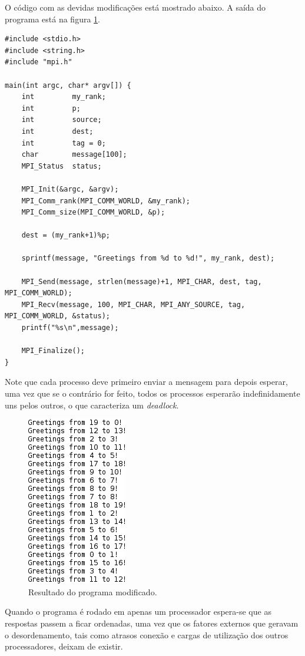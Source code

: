 \documentclass[11pt,a4paper,onecolumn]{article}
\begin{document}
O código com as devidas modificações está mostrado abaixo. A saída do programa está na figura \ref{fig:exp}.
\begin{lstlisting}[style=cc,firstnumber=18]
#include <stdio.h>
#include <string.h>
#include "mpi.h"

main(int argc, char* argv[]) {
    int         my_rank;
    int         p;
    int         source;
    int         dest;
    int         tag = 0;
    char        message[100];
    MPI_Status  status;

    MPI_Init(&argc, &argv);
    MPI_Comm_rank(MPI_COMM_WORLD, &my_rank);
    MPI_Comm_size(MPI_COMM_WORLD, &p);

    dest = (my_rank+1)%p;

    sprintf(message, "Greetings from %d to %d!", my_rank, dest);

    MPI_Send(message, strlen(message)+1, MPI_CHAR, dest, tag, MPI_COMM_WORLD);
    MPI_Recv(message, 100, MPI_CHAR, MPI_ANY_SOURCE, tag, MPI_COMM_WORLD, &status);
    printf("%s\n",message);

    MPI_Finalize();
}
\end{lstlisting}

Note que cada processo deve primeiro enviar a mensagem para depois esperar, uma vez que se o contrário for feito, todos os processos esperarão indefinidamente uns pelos outros, o que caracteriza um \textit{deadlock}.

\begin{figure}[h!]
  \centering
  \includegraphics[]{../exp/ResultadoMod}
  \caption{Resultado do programa modificado.}
  \label{fig:exp}
\end{figure}

Quando o programa é rodado em apenas um processador espera-se que as respostas passem a ficar ordenadas, uma vez que os fatores externos que geravam o desordenamento, tais como atrasos conexão e cargas de utilização dos outros processadores, deixam de existir.
\end{document}
